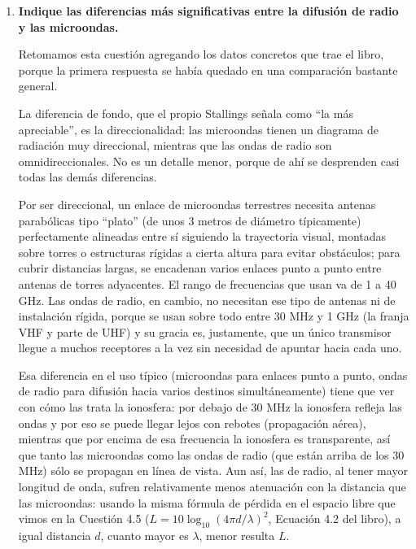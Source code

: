 \documentclass[11pt,a4paper]{article}
\begin{document}
\begin{enumerate}[label=4.\arabic*), itemsep=0.3cm]
        Esta separación, junto con el aislamiento entre los circuitos y las antenas, permite que el satélite reciba y retransmita simultáneamente facilitando la separación de la señal y conservando la información transportada.
  \item
        \textbf{Indique las diferencias más significativas entre la difusión de radio y las microondas.}

        Retomamos esta cuestión agregando los datos concretos que trae el libro, porque la primera respuesta se había quedado en una comparación bastante general.

        La diferencia de fondo, que el propio Stallings señala como ``la más apreciable'', es la direccionalidad: las microondas tienen un diagrama de radiación muy direccional, mientras que las ondas de radio son omnidireccionales. No es un detalle menor, porque de ahí se desprenden casi todas las demás diferencias.

        Por ser direccional, un enlace de microondas terrestres necesita antenas parabólicas tipo ``plato'' (de unos 3 metros de diámetro típicamente) perfectamente alineadas entre sí siguiendo la trayectoria visual, montadas sobre torres o estructuras rígidas a cierta altura para evitar obstáculos; para cubrir distancias largas, se encadenan varios enlaces punto a punto entre antenas de torres adyacentes. El rango de frecuencias que usan va de 1 a 40 GHz. Las ondas de radio, en cambio, no necesitan ese tipo de antenas ni de instalación rígida, porque se usan sobre todo entre 30 MHz y 1 GHz (la franja VHF y parte de UHF) y su gracia es, justamente, que un único transmisor llegue a muchos receptores a la vez sin necesidad de apuntar hacia cada uno.

        Esa diferencia en el uso típico (microondas para enlaces punto a punto, ondas de radio para difusión hacia varios destinos simultáneamente) tiene que ver con cómo las trata la ionosfera: por debajo de 30 MHz la ionosfera refleja las ondas y por eso se puede llegar lejos con rebotes (propagación aérea), mientras que por encima de esa frecuencia la ionosfera es transparente, así que tanto las microondas como las ondas de radio (que están arriba de los 30 MHz) sólo se propagan en línea de vista. Aun así, las de radio, al tener mayor longitud de onda, sufren relativamente menos atenuación con la distancia que las microondas: usando la misma fórmula de pérdida en el espacio libre que vimos en la Cuestión 4.5 ($L = 10\log_{10}(4\pi d/\lambda)^2$, Ecuación 4.2 del libro), a igual distancia $d$, cuanto mayor es $\lambda$, menor resulta $L$.


\end{enumerate}
\end{document}
